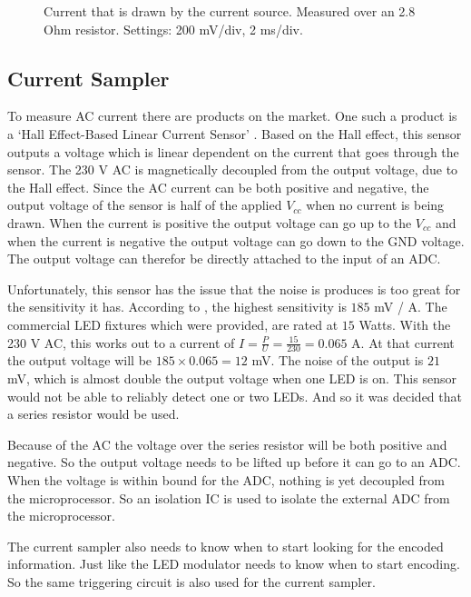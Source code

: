 \begin{figure}[!tbp]
\begin{minipage}[b]{0.49\textwidth}
	    \caption{Current that is drawn by the current source. Measured over an 2.8 Ohm resistor. Settings: 200 mV/div, 2 ms/div.}
		\label{fig:current-source-measurement}
	  \end{minipage}
	\end{figure}


\subsection{Current Sampler}

To measure AC current there are products on the market.
One such a product is a `Hall Effect-Based Linear Current Sensor' \cite{hall-ac-current-sensor-datasheet}.
Based on the Hall effect, this sensor outputs a voltage which is linear dependent on the current that goes through the sensor.
The 230 V AC is magnetically decoupled from the output voltage, due to the Hall effect.
Since the AC current can be both positive and negative, the output voltage of the sensor is half of the applied $V_{cc}$ when no current is being drawn.
When the current is positive the output voltage can go up to the $V_{cc}$ and when the current is negative the output voltage can go down to the GND voltage. 
The output voltage can therefor be directly attached to the input of an ADC.


Unfortunately, this sensor has the issue that the noise is produces is too great for the sensitivity it has.
According to \cite{hall-ac-current-sensor-datasheet}, the highest sensitivity is $185$ mV / A.
The commercial LED fixtures which were provided, are rated at $15$ Watts.
With the 230 V AC, this works out to a current of $I = \frac{P}{U} = \frac{15}{230} = 0.065$ A.
At that current the output voltage will be $185 \times 0.065 = 12$ mV.
The noise of the output is $21$ mV, which is almost double the output voltage when one LED is on.
This sensor would not be able to reliably detect one or two LEDs.
And so it was decided that a series resistor would be used.

Because of the AC the voltage over the series resistor will be both positive and negative.
So the output voltage needs to be lifted up before it can go to an ADC.
When the voltage is within bound for the ADC, nothing is yet decoupled from the microprocessor.
So an isolation IC is used to isolate the external ADC from the microprocessor.

The current sampler also needs to know when to start looking for the encoded information.
Just like the LED modulator needs to know when to start encoding.
So the same triggering circuit is also used for the current sampler.

